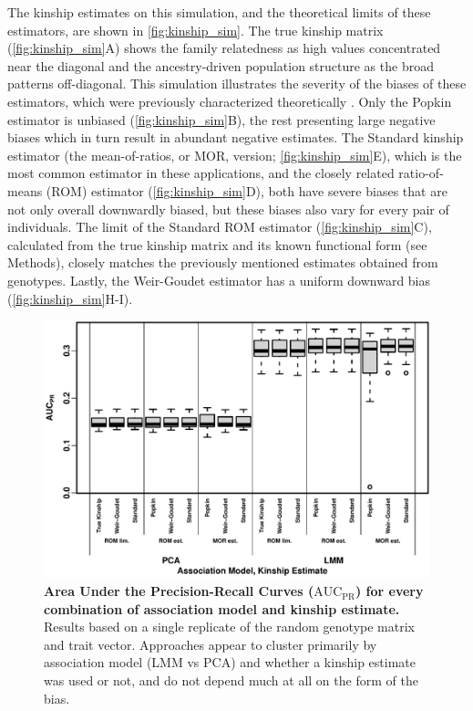 \documentclass[11pt]{article}
\newcommand{\auc}{\text{AUC}_\text{PR}}
\begin{document}
The kinship estimates on this simulation, and the theoretical limits of these estimators, are shown in \cref{fig:kinship_sim}.
The true kinship matrix (\cref{fig:kinship_sim}A) shows the family relatedness as high values concentrated near the diagonal and the ancestry-driven population structure as the broad patterns off-diagonal.
This simulation illustrates the severity of the biases of these estimators, which were previously characterized theoretically \citep{ochoa_estimating_2021}.
Only the Popkin estimator is unbiased (\cref{fig:kinship_sim}B), the rest presenting large negative biases which in turn result in abundant negative estimates.
The Standard kinship estimator (the mean-of-ratios, or MOR, version; \cref{fig:kinship_sim}E), which is the most common estimator in these applications, and the closely related ratio-of-means (ROM) estimator (\cref{fig:kinship_sim}D), both have severe biases that are not only overall downwardly biased, but these biases also vary for every pair of individuals.
The limit of the Standard ROM estimator (\cref{fig:kinship_sim}C), calculated from the true kinship matrix and its known functional form (see Methods), closely matches the previously mentioned estimates obtained from genotypes.
Lastly, the Weir-Goudet estimator has a uniform downward bias (\cref{fig:kinship_sim}H-I).


\begin{figure}[bp!]
  \centering
  \includegraphics[width=\textwidth]{auc.pdf}
  \caption{
    {\bf Area Under the Precision-Recall Curves ($\auc$) for every combination of association model and kinship estimate.}
    Results based on a single replicate of the random genotype matrix and trait vector.
    Approaches appear to cluster primarily by association model (LMM vs PCA) and whether a kinship estimate was used or not, and do not depend much at all on the form of the bias.
  }
  \label{fig:auc_sim}
\end{figure}
\end{document}
